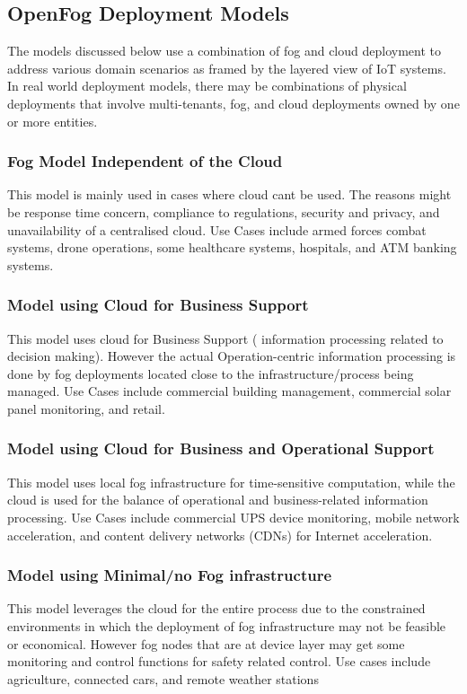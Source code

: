 \documentclass{article}
\begin{document}
\subsection{OpenFog Deployment Models} 
The models discussed below use a combination of fog and cloud deployment to address various domain scenarios as framed by the layered view of IoT systems.
In real world deployment models, there may be combinations of physical deployments that involve multi-tenants, fog, and cloud deployments owned by one or more entities. 
\subsubsection{Fog Model Independent of the Cloud}
This model is mainly used in cases where cloud cant be used. The reasons might be response time concern, compliance to regulations, security and privacy, and unavailability of a centralised cloud. 
Use Cases include armed forces combat systems, drone operations, some healthcare systems, hospitals, and ATM banking systems.
\subsubsection{Model using Cloud for Business Support}
This model uses cloud for Business Support ( information processing related to decision making).  However the actual Operation-centric information processing is done by fog deployments located close to the infrastructure/process being managed.
Use Cases include commercial building management, commercial solar panel monitoring, and retail.
\subsubsection{Model using Cloud for Business and Operational Support}
This model uses local fog infrastructure for time-sensitive computation, while the cloud is used for the balance of operational and business-related information processing.    
Use Cases include commercial UPS device monitoring, mobile network acceleration, and content delivery networks (CDNs) for Internet acceleration.
\subsubsection{Model using Minimal/no Fog infrastructure}
This model leverages the cloud for the entire process due to the constrained environments in which the deployment of fog infrastructure may not be feasible or economical. However fog nodes that are at device layer may get some monitoring and control functions for safety related control.
Use cases include agriculture, connected cars, and remote weather stations  
\end{document}
